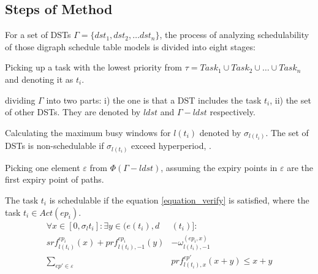 \documentclass[10pt,conference]{IEEEtran}
\begin{document}
\subsection{Steps of Method}\label{section_8steps}
For a set of DSTs $\Gamma=\{dst_1,dst_2, \dots dst_n\}$, the process of analyzing schedulability of those digraph schedule table models is divided into eight stages:
\begin{compactenum}

  \item Picking up a task with the lowest priority from $\tau=Task_1\cup Task_2\cup\dots\cup Task_n$ and denoting it as $t_i$. %
  \item dividing $\Gamma$ into two parts: i) the one is that a DST includes the task $t_i$, ii) the set of other DSTs. They are denoted by $ldst$ and $\Gamma-ldst$ respectively. %

  \item Calculating the maximum busy windows for $l(t_i)$ denoted by $\sigma_{l(t_i)}$. The set of DSTs is non-schedulable if $\sigma_{l(t_i)}$ exceed hyperperiod, .%
  
  \item Picking one element $\varepsilon$ from $\Phi(\Gamma-ldst)$, assuming the expiry points in $\varepsilon$ are the first expiry point of paths.

  \item The task $t_i$ is schedulable if the equation \ref{equation_verify} is satisfied, where the task $t_i\in Act(ep_i)$.
  \begin{equation}\begin{split}
      \forall x\in[0,\sigma_l{t_i}]:\exists y\in(e(t_i),d&(t_i)]:
      \\
      srf^{ep_i}_{l(t_i)}(x)+prf^{ep_i}_{l(t_i),-1}(y)&-\omega^{(ep_i,x)}_{l(t_i),-1}
      \\
      \sum\limits_{ep'\in\varepsilon}&prf^{ep'}_{l(t_i),x}(x+y)\leq x+y
    \end{split}\label{equation_verify}\end{equation}
  

\end{compactenum}
\end{document}
